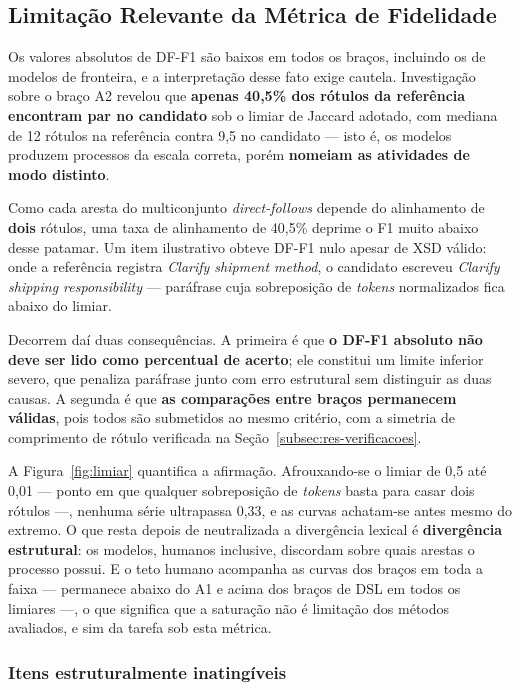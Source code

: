 \subsection{Limitação Relevante da Métrica de Fidelidade}
\label{subsec:res-limitacao-df}

Os valores absolutos de DF-F1 são baixos em todos os braços, incluindo os de modelos de fronteira, e a interpretação desse fato exige cautela. Investigação sobre o braço A2 revelou que \textbf{apenas 40,5\% dos rótulos da referência encontram par no candidato} sob o limiar de Jaccard adotado, com mediana de 12 rótulos na referência contra 9,5 no candidato — isto é, os modelos produzem processos da escala correta, porém \textbf{nomeiam as atividades de modo distinto}.

Como cada aresta do multiconjunto \textit{direct-follows} depende do alinhamento de \textbf{dois} rótulos, uma taxa de alinhamento de 40,5\% deprime o F1 muito abaixo desse patamar. Um item ilustrativo obteve DF-F1 nulo apesar de XSD válido: onde a referência registra \textit{Clarify shipment method}, o candidato escreveu \textit{Clarify shipping responsibility} --- paráfrase cuja sobreposição de \textit{tokens} normalizados fica abaixo do limiar.

Decorrem daí duas consequências. A primeira é que \textbf{o DF-F1 absoluto não deve ser lido como percentual de acerto}; ele constitui um limite inferior severo, que penaliza paráfrase junto com erro estrutural sem distinguir as duas causas. A segunda é que \textbf{as comparações entre braços permanecem válidas}, pois todos são submetidos ao mesmo critério, com a simetria de comprimento de rótulo verificada na Seção~\ref{subsec:res-verificacoes}.



A Figura~\ref{fig:limiar} quantifica a afirmação. Afrouxando-se o limiar de 0,5 até 0,01 --- ponto em que qualquer sobreposição de \textit{tokens} basta para casar dois rótulos ---, nenhuma série ultrapassa 0,33, e as curvas achatam-se antes mesmo do extremo. O que resta depois de neutralizada a divergência lexical é \textbf{divergência estrutural}: os modelos, humanos inclusive, discordam sobre quais arestas o processo possui. E o teto humano acompanha as curvas dos braços em toda a faixa --- permanece abaixo do A1 e acima dos braços de DSL em todos os limiares ---, o que significa que a saturação não é limitação dos métodos avaliados, e sim da tarefa sob esta métrica.

\subsubsection*{Itens estruturalmente inatingíveis}

